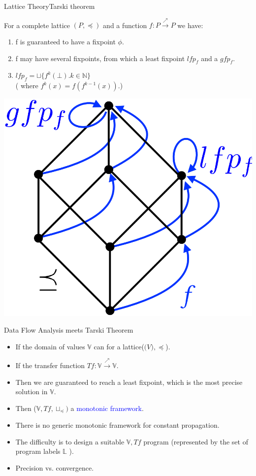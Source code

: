 \begin{frame}{Lattice Theory}{Tarski theorem}
\begin{theorem}
For a complete lattice $(P,\preceq)$ and a function  $f: P  \xrightarrow{\scriptscriptstyle \nearrow} P$ we have:
\begin{enumerate}
\item f is guaranteed to have a fixpoint $\phi$.
\item f may have several fixpoints, from which a least fixpoint $lfp_f$ and a $gfp_f$.
\item  $lfp_f= \sqcup \{f^k (\bot). k \in \mathbb{N}\}$ \\( where $  \scriptstyle f^k(x)=f(f^{k-1}(x))$.)  
\end{enumerate}
\end{theorem}
\centering \includegraphics[scale=0.25]{content/images/static-analysis/lfp.png}
\end{frame}


\begin{frame}{Data Flow Analysis meets Tarski Theorem}
\begin{itemize}
	\item If the domain of values $\mathbb{V}$ can for a  lattice($\mathbb(V),\preceq $). 
	\item If  the transfer function $Tf: \mathbb{V}  \xrightarrow{\scriptscriptstyle \nearrow} \mathbb{V} $.
	\item Then we are guaranteed to reach a least fixpoint, which is the most precise solution in $\mathbb{V}$.
	\item Then ($ \mathbb{V}, Tf, \sqcup_ \preceq)$ a \textcolor{blue}{monotonic framework}.
	\item There is no generic monotonic framework for constant propagation.
	\item The difficulty is to design a suitable $\mathbb{V}, Tf$  program (represented by the set of program labels $\mathbb{L}$ ). 
	\item Precision vs. convergence.
\end{itemize}
\end{frame}


